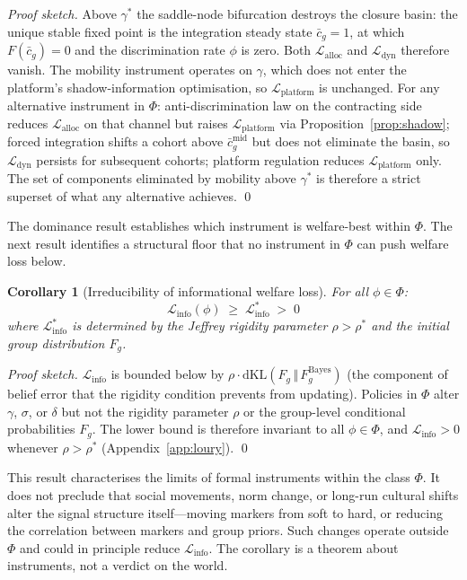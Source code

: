 \documentclass[12pt,a4paper]{article}
\newtheorem{corollary}[proposition]{Corollary}
\theoremstyle{definition}
\numberwithin{proposition}{subsection}
\begin{document}
\begin{proof}[Proof sketch]
Above $\gamma^*$ the saddle-node bifurcation destroys the closure
basin: the unique stable fixed point is the integration steady
state $\bar{c}_g = 1$, at which $F(\bar{c}_g) = 0$ and the
discrimination rate $\phi$ is zero. Both $\mathcal{L}_{\text{alloc}}$
and $\mathcal{L}_{\text{dyn}}$ therefore vanish. The mobility
instrument operates on $\gamma$, which does not enter the
platform's shadow-information optimisation, so
$\mathcal{L}_{\text{platform}}$ is unchanged. For any alternative
instrument in $\Phi$: anti-discrimination law on the contracting
side reduces $\mathcal{L}_{\text{alloc}}$ on that channel but
raises $\mathcal{L}_{\text{platform}}$ via
Proposition~\ref{prop:shadow}; forced integration shifts a cohort
above $\bar{c}_g^{\mathrm{mid}}$ but does not eliminate the basin,
so $\mathcal{L}_{\text{dyn}}$ persists for subsequent cohorts;
platform regulation reduces $\mathcal{L}_{\text{platform}}$ only.
The set of components eliminated by mobility above $\gamma^*$ is
therefore a strict superset of what any alternative achieves.
\qed
\end{proof}

The dominance result establishes which instrument is welfare-best
within $\Phi$. The next result identifies a structural floor that
no instrument in $\Phi$ can push welfare loss below.

\begin{corollary}[Irreducibility of informational welfare loss]
\label{cor:irreducibility}
For all $\phi \in \Phi$:
\[
  \mathcal{L}_{\mathrm{info}}(\phi)
  \;\geq\; \mathcal{L}_{\mathrm{info}}^* \;>\; 0
\]
where $\mathcal{L}_{\mathrm{info}}^*$ is determined by the Jeffrey
rigidity parameter $\rho > \rho^*$ and the initial group
distribution $F_g$.
\end{corollary}

\begin{proof}[Proof sketch]
$\mathcal{L}_{\text{info}}$ is bounded below by
$\rho \cdot \mathrm{dKL}(F_g \,\Vert\, F_g^{\mathrm{Bayes}})$ (the
component of belief error that the rigidity condition prevents
from updating). Policies in $\Phi$ alter $\gamma$, $\sigma$, or
$\delta$ but not the rigidity parameter $\rho$ or the
group-level conditional probabilities $F_g$. The lower bound is
therefore invariant to all $\phi \in \Phi$, and
$\mathcal{L}_{\text{info}} > 0$ whenever $\rho > \rho^*$
(Appendix~\ref{app:loury}). \qed
\end{proof}

This result characterises the limits of formal instruments within
the class $\Phi$. It does not preclude that social movements, norm
change, or long-run cultural shifts alter the signal structure
itself---moving markers from soft to hard, or reducing the
correlation between markers and group priors. Such changes operate
outside $\Phi$ and could in principle reduce
$\mathcal{L}_{\text{info}}$. The corollary is a theorem about
instruments, not a verdict on the world.
\end{document}
